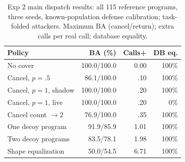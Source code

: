 \begin{table}[t]\centering\footnotesize\setlength{\tabcolsep}{3pt}
\caption{Exp 2 main dispatch results: all 115 reference programs, three seeds, known-population defense calibration; task-folded attackers. Maximum BA (cancel/return); extra calls per real call; database equality.}\label{tab:r7-e6}
\begin{tabularx}{\columnwidth}{@{}Yrrr@{}}\toprule
Policy & BA (\%) & Calls+ & DB eq.\\\midrule
No cover & 100.0/100.0 & 0.00 & 100\%\\
Cancel, $p=.5$ & 86.1/100.0 & .10 & 100\%\\
Cancel, $p=1$, shadow & 100.0/100.0 & .20 & 100\%\\
Cancel, $p=1$, live & 100.0/100.0 & .20 & 0\%\\
Cancel count $\to2$ & 76.9/100.0 & .35 & 100\%\\
One decoy program & 91.9/85.9 & 1.01 & 100\%\\
Two decoy programs & 83.5/78.1 & 1.98 & 100\%\\
Shape equalization & 50.0/54.5 & 6.71 & 100\%\\\bottomrule
\end{tabularx}\end{table}
